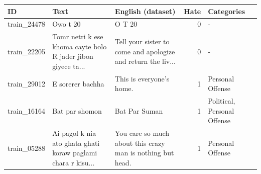 \begin{tabular}{lllrl}
\toprule
ID & Text & English (dataset) & Hate & Categories \\
\midrule
train\_24478 & Owo t 20 & O T 20 & 0 & - \\
train\_22205 & Tomr netri k ese khoma cayte bolo R jader jibon giyece ta... & Tell your sister to come and apologize and return the liv... & 0 & - \\
train\_29012 & E sorerer bachha & This is everyone's home. & 1 & Personal Offense \\
train\_16164 & Bat par shomon & Bat Par Suman & 1 & Political, Personal Offense \\
train\_05288 & Ai pagol k nia ato ghata ghati koraw paglami chara r kisu... & You care so much about this crazy man is nothing but head. & 1 & Personal Offense \\
\bottomrule
\end{tabular}
